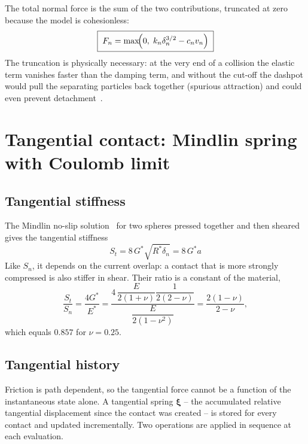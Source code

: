 The total normal force is the sum of the two contributions, truncated at zero
because the model is cohesionless:
\begin{equation}
  \boxed{\;
  F_{n} = \max\!\Bigl(0,\;
          k_{n}\delta_{n}^{3/2} - c_{n} v_{n}\Bigr) \;}
  \label{eq:Fn}
\end{equation}
The truncation is physically necessary: at the very end of a collision the
elastic term vanishes faster than the damping term, and without the cut-off the
dashpot would pull the separating particles back together (spurious attraction)
and could even prevent detachment~\cite{direnzo2004}.

\section{Tangential contact: Mindlin spring with Coulomb limit}
\label{sec:tangential}

\subsection{Tangential stiffness}

The Mindlin no-slip solution~\cite{mindlin1949,mindlin1953} for two spheres
pressed together and then sheared gives the tangential stiffness
\begin{equation}
  \boxed{\;S_{t} = 8\,G^{*}\sqrt{R^{*}\delta_{n}} = 8\,G^{*}a\;}
  \label{eq:St}
\end{equation}
Like $S_{n}$, it depends on the current overlap: a contact that is more strongly
compressed is also stiffer in shear.  Their ratio is a constant of the material,
\begin{equation}
  \frac{S_{t}}{S_{n}} = \frac{4G^{*}}{E^{*}}
  = \frac{4\,\dfrac{E}{2(1+\nu)}\dfrac{1}{2(2-\nu)}}
         {\dfrac{E}{2(1-\nu^{2})}}
  = \frac{2(1-\nu)}{2-\nu} ,
\end{equation}
which equals $0.857$ for $\nu=0.25$.

\subsection{Tangential history}

Friction is path dependent, so the tangential force cannot be a function of the
instantaneous state alone.  A tangential spring $\boldsymbol{\xi}$ -- the
accumulated relative tangential displacement since the contact was created -- is
stored for every contact and updated incrementally.  Two operations are applied
in sequence at each evaluation.

